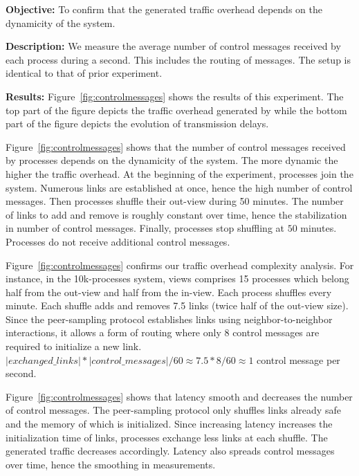 \noindent \textbf{Objective:} To confirm that the generated traffic overhead
depends on the dynamicity of the system.

\noindent \textbf{Description:} We measure the average number of control
messages received by each process during a second. This includes the routing of
messages. The setup is identical to that of prior experiment.

\noindent \textbf{Results:} Figure~\ref{fig:controlmessages} shows the results of
this experiment. The top part of the figure depicts the traffic overhead
generated by \RPCBROADCAST while the bottom part of the figure depicts the
evolution of transmission delays.


\noindent Figure~\ref{fig:controlmessages} shows that the number of control messages
  received by processes depends on the dynamicity of the system. The more
  dynamic the higher the traffic overhead. At the beginning of the experiment,
  processes join the system. Numerous links are established at once, hence the
  high number of control messages. Then processes shuffle their out-view during
  50 minutes. The number of links to add and remove is roughly constant over
  time, hence the stabilization in number of control messages. Finally,
  processes stop shuffling at $50$ minutes. Processes do not receive additional
  control messages.

\noindent Figure~\ref{fig:controlmessages} confirms our traffic overhead complexity
  analysis. For instance, in the 10k-processes system, views comprises 15
  processes which belong half from the out-view and half from the in-view.  Each
  process shuffles every minute. Each shuffle adds and removes 7.5 links (twice
  half of the out-view size). Since the peer-sampling protocol establishes links
  using neighbor-to-neighbor interactions, it allows a form of routing where
  only 8 control messages are required to initialize a new link.
  $|exchanged\_links|*|control\_messages|/60 \approx 7.5*8/60 \approx 1$ control
  message per second.

\noindent Figure~\ref{fig:controlmessages} shows that latency smooth and decreases
  the number of control messages. The peer-sampling protocol only shuffles links
  already safe and the memory of which is initialized. Since increasing latency
  increases the initialization time of links, processes exchange less links at
  each shuffle. The generated traffic decreases accordingly. Latency also
  spreads control messages over time, hence the smoothing in measurements.

